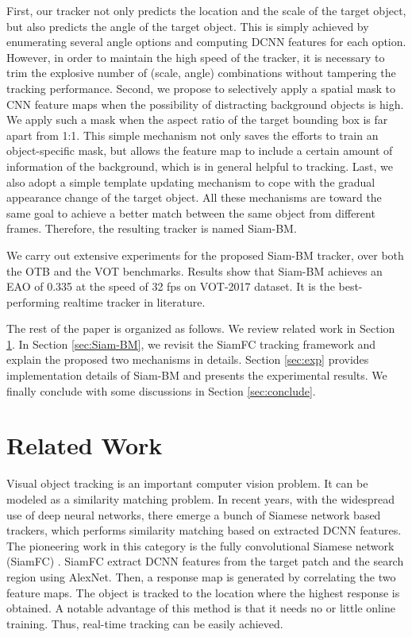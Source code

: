 \documentclass[runningheads]{llncs}
\begin{document}
    First, our tracker not only predicts the location and the scale of the target object, but also predicts the angle of the target object. This is simply achieved by enumerating several angle options and computing DCNN features for each option. However, in order to maintain the high speed of the tracker, it is necessary to trim the explosive number of (scale, angle) combinations without tampering the tracking performance. 
    Second, we propose to selectively apply a spatial mask to CNN feature maps when the possibility of distracting background objects is high. We apply such a mask when the aspect ratio of the target bounding box is far apart from 1:1. This simple mechanism not only saves the efforts to train an object-specific mask, but allows the feature map to include a certain amount of information of the background, which is in general helpful to tracking. 
    Last, we also adopt a simple template updating mechanism to cope with the gradual appearance change of the target object. All these mechanisms are toward the same goal to achieve a better match between the same object from different frames. Therefore, the resulting tracker is named Siam-BM.
    
    We carry out extensive experiments for the proposed Siam-BM tracker, over both the OTB and the VOT benchmarks. Results show that Siam-BM achieves an EAO of 0.335 at the speed of 32 fps on VOT-2017 dataset. It is the best-performing realtime tracker in literature.  

    The rest of the paper is organized as follows. We review related work in Section \ref{sec:related}. In Section \ref{sec:Siam-BM}, we revisit the SiamFC tracking framework and explain the proposed two mechanisms in details. Section \ref{sec:exp} provides implementation details of Siam-BM and presents the experimental results. We finally conclude with some discussions in Section \ref{sec:conclude}. 
    
\section{Related Work}\label{sec:related}
    Visual object tracking is an important computer vision problem. It can be modeled as a similarity matching problem. In recent years, with the widespread use of deep neural networks, there emerge a bunch of Siamese network based trackers, which performs similarity matching based on extracted DCNN features. The pioneering work in this category is the fully convolutional Siamese network (SiamFC) \cite{SiamFC}. SiamFC extract DCNN features from the target patch and the search region using AlexNet. Then, a response map is generated by correlating the two feature maps. The object is tracked to the location where the highest response is obtained. A notable advantage of this method is that it needs no or little online training. Thus, real-time tracking can be easily achieved.  
    
\end{document}
